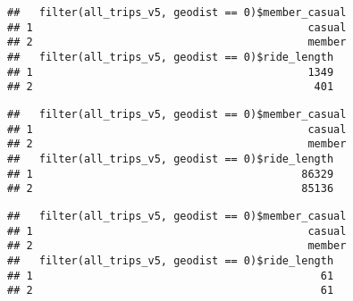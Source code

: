 \documentclass[
]{article}
\newenvironment{Shaded}{\begin{snugshade}}{\end{snugshade}}
\newcommand{\AttributeTok}[1]{\textcolor[rgb]{0.77,0.63,0.00}{#1}}
\newcommand{\DecValTok}[1]{\textcolor[rgb]{0.00,0.00,0.81}{#1}}
\newcommand{\FunctionTok}[1]{\textcolor[rgb]{0.00,0.00,0.00}{#1}}
\newcommand{\NormalTok}[1]{#1}
\newcommand{\SpecialCharTok}[1]{\textcolor[rgb]{0.00,0.00,0.00}{#1}}
\begin{document}
\begin{verbatim}
##   filter(all_trips_v5, geodist == 0)$member_casual
## 1                                           casual
## 2                                           member
##   filter(all_trips_v5, geodist == 0)$ride_length
## 1                                           1349
## 2                                            401
\end{verbatim}

\begin{Shaded}
\end{Shaded}

\begin{verbatim}
##   filter(all_trips_v5, geodist == 0)$member_casual
## 1                                           casual
## 2                                           member
##   filter(all_trips_v5, geodist == 0)$ride_length
## 1                                          86329
## 2                                          85136
\end{verbatim}

\begin{Shaded}
\end{Shaded}

\begin{verbatim}
##   filter(all_trips_v5, geodist == 0)$member_casual
## 1                                           casual
## 2                                           member
##   filter(all_trips_v5, geodist == 0)$ride_length
## 1                                             61
## 2                                             61
\end{verbatim}
\end{document}
